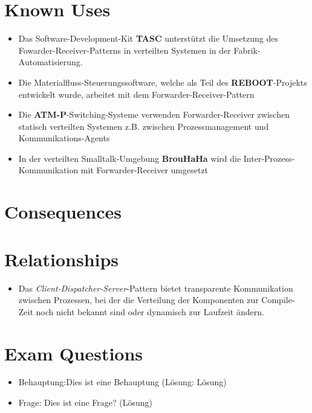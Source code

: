 \section{Known Uses}
\begin{itemize}
	\item Das Software-Development-Kit \textbf{TASC} unterstützt die Umsetzung des Fowarder-Receiver-Patterns in verteilten Systemen in der Fabrik-Automatisierung.
	\item Die Materialfluss-Steuerungssoftware, welche als Teil des \textbf{REBOOT}-Projekts entwickelt wurde, arbeitet mit dem Forwarder-Receiver-Pattern
	\item Die \textbf{ATM-P}-Switching-Systeme verwenden Forwarder-Receiver zwischen statisch verteilten Systemen z.B. zwischen Prozessmanagement und Kommunikations-Agents
	\item In der verteilten Smalltalk-Umgebung \textbf{BrouHaHa} wird die Inter-Prozess-Kommunikation mit Forwarder-Receiver umgesetzt
\end{itemize}

\section{Consequences}
\begin{itemize}
\end{itemize}

\section{Relationships}
\begin{itemize}
	\item Das \textit{Client-Dispatcher-Server}-Pattern bietet transparente Kommunikation zwischen Prozessen, bei der die Verteilung der Komponenten zur Compile-Zeit noch nicht bekannt sind oder dynamisch zur Laufzeit ändern. 
\end{itemize}

\section{Exam Questions}
\begin{itemize}
  	\item Behauptung:Dies ist eine Behauptung (Lösung: Lösung)
    \item Frage: Dies ist eine Frage? (Lösung)
\end{itemize}
